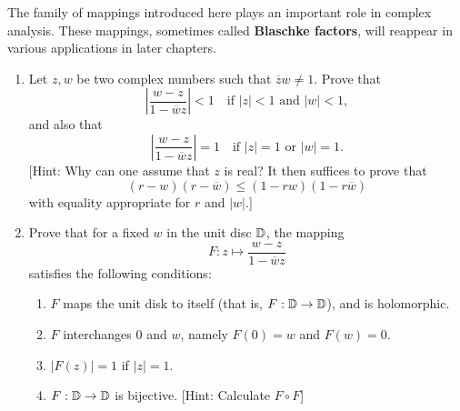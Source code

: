 \documentclass[../hw1]{subfiles}
\begin{document}
\begin{problem}
The family of mappings introduced here plays an important role in complex
analysis.
These mappings, sometimes called \textbf{Blaschke factors}, will reappear in
various applications in later chapters.
\begin{enumerate}[label = (\alph*)]
	\item Let $z,w$ be two complex numbers such that  $\overline{z} w \neq 1$.
	      Prove that \[
		      \left| \frac{w-z}{1-\overline{w}z} \right| <1\quad \text{if } |z|<1 \text{ and } |w| < 1
		      ,\] and also that \[
		      \left| \frac{w-z}{1-\overline{w}z} \right| =1\quad \text{if } |z|=1 \text{ or } |w| = 1
		      .\]
	      [Hint: Why can one assume that $z$ is real?
	      It then suffices to prove that  \[
		      (r-w)(r-\overline{w})\le (1-rw)(1-r\overline{w})
	      \] with equality appropriate for $r$ and  $|w|$.]
	\item Prove that for a fixed $w$ in the unit disc  $\mathbb{D}$, the mapping \[
		      F: z \mapsto \frac{w-z}{1-\overline{w}z}
	      \] satisfies the following conditions:
	      \begin{enumerate}[label = (\roman*)]
		      \item $F$ maps the unit disk to itself (that is, $F:\mathbb{D} \to \mathbb{D}$), and is holomorphic.
		      \item $F$ interchanges 0 and $w$, namely $F(0)=w$ and $F(w)=0$.
		      \item $|F(z)| = 1$ if $|z| = 1$.
		      \item $F:\mathbb{D} \to \mathbb{D}$ is bijective.
			            [Hint: Calculate $F \circ F$]
	      \end{enumerate}
\end{enumerate}
\end{problem}
\end{document}
